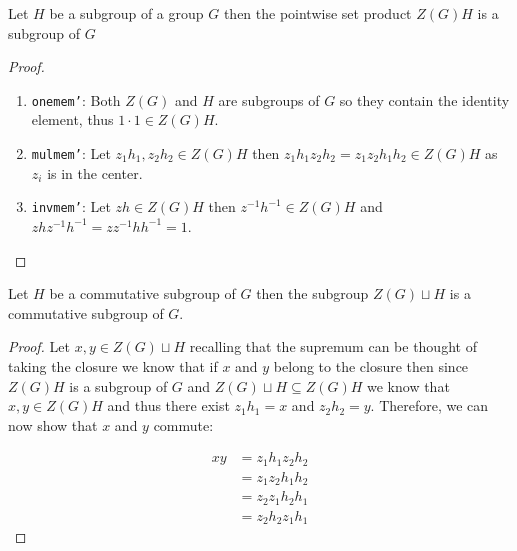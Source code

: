 \begin{lemma}
  \label{center_mul}
  \leanok
  Let $H$ be a subgroup of a group $G$ then the pointwise set product $Z(G) H$ is a subgroup of $G$
\end{lemma}
\begin{proof}
\leanok
\begin{enumerate}
  \item \texttt{one\textunderscore mem'}: Both $Z(G)$ and $H$ are subgroups of $G$ so they contain the identity element, thus $1 \cdot 1 \in Z(G) H$.
  \item \texttt{mul\textunderscore mem'}: Let $z_1 h_1, z_2 h_2 \in Z(G) H$ then $z_1h_1z_2h_2 = z_1z_2 h_1h_2 \in Z(G) H$ as $z_i$ is in the center.
  \item \texttt{inv\textunderscore mem'}: Let $zh \in Z(G) H$ then $z^{-1} h^{-1} \in Z(G) H$ and $z h z^{-1} h^{-1} = zz^{-1}h h^{-1} = 1$.
\end{enumerate}
\end{proof}




\begin{lemma}
  \label{IsComm_of_center_join_IsComm}
  \leanok
  Let $H$ be a commutative subgroup of $G$ then the subgroup $Z(G) \sqcup H$  is a commutative subgroup of $G$.
\end{lemma}
\begin{proof}
  \leanok
  Let $x, y \in Z(G) \sqcup H$ recalling that the supremum can be thought of taking the closure
  we know that if $x$ and $y$ belong to the closure then since $Z(G) H$ is a subgroup of $G$ and $Z(G) \sqcup H \subseteq Z(G) H$
  we know that $x, y \in Z(G) H$ and thus there exist $z_1 h_1 = x$ and $z_2 h_2 = y$. Therefore, we can now show that $x$ and $y$ commute:

  \begin{align*}
  x y &= z_1 h_1 z_2 h_2\\
  & = z_1 z_2 h_1 h_2 \tag{as $z_2$ is in the center}\\
  &= z_2 z_1 h_2 h_1 \tag{as $H$ is a commutative subgroup}\\
  &= z_2 h_2 z_1 h_1 \tag{as $z_1$ is in the center}
  \end{align*}
\end{proof}



